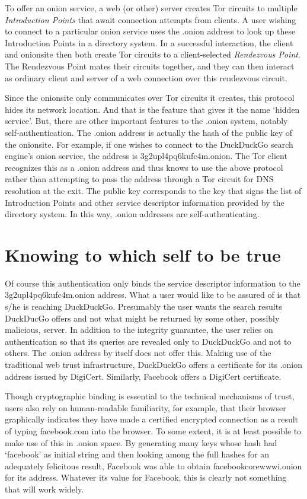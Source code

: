 \documentclass[10pt, conference, compsocconf]{styles/IEEEtran}
\begin{document}
To offer an onion service, a web (or other) server creates Tor circuits to
multiple \emph{Introduction Points} that await connection attempts
from clients. A user wishing to connect to a particular onion service
uses the .onion address to look up these Introduction Points in a
directory system. In a successful interaction, the client and
onionsite then both create Tor circuits to a client-selected
\emph{Rendezvous Point}. The Rendezvous Point mates their circuits
together, and they can then interact as ordinary client and server of
a web connection over this rendezvous circuit.

Since the onionsite only communicates over Tor circuits it creates,
this protocol hides its network location. And that is the feature that
gives it the name `hidden service'. But, there are other important
features to the .onion system, notably self-authentication. The .onion
address is actually the hash of the public key of the onionsite. For
example, if one wishes to connect to the DuckDuckGo search engine's
onion service, the address is 3g2upl4pq6kufc4m.onion. The Tor client
recognizes this as a .onion address and thus knows to use the above
protocol rather than attempting to pass the address through a Tor
circuit for DNS resolution at the exit. The public key
corresponds to the key that signs the list of Introduction Points
and other service descriptor information provided by the directory
system. In this way, .onion addresses are self-authenticating.

\section{Knowing to which self to be true}

Of course this authentication only binds the service descriptor
information to the 3g2upl4pq6kufc4m.onion address. What a user would
like to be assured of is that s/he is reaching DuckDuckGo. Presumably
the user wants the search results DuckDucGo offers and not what might
be returned by some other, possibly malicious, server.  In addition to
the integrity guarantee, the user relies on authentication so that its
queries are revealed only to DuckDuckGo and not to others. The
.onion address by itself does not offer this.
Making use of the traditional web trust infrastructure, DuckDuckGo
offers a certificate for its .onion address issued by DigiCert.
Similarly, Facebook offers a DigiCert certificate.

Though cryptographic binding is essential to the technical mechanisms
of trust, users also rely on human-readable familiarity, for example, that
their browser graphically indicates they have made a certified encrypted
connection as a result of typing facebook.com into the browser.  To
some extent, it is at least possible to make use of this in .onion
space. By generating many keys whose hash had `facebook' as initial
string and then looking among the full hashes for an adequately
felicitous result, Facebook was able to obtain facebookcorewwwi.onion
for its address. Whatever its value for Facebook, this is clearly not
something that will work widely.
\end{document}
